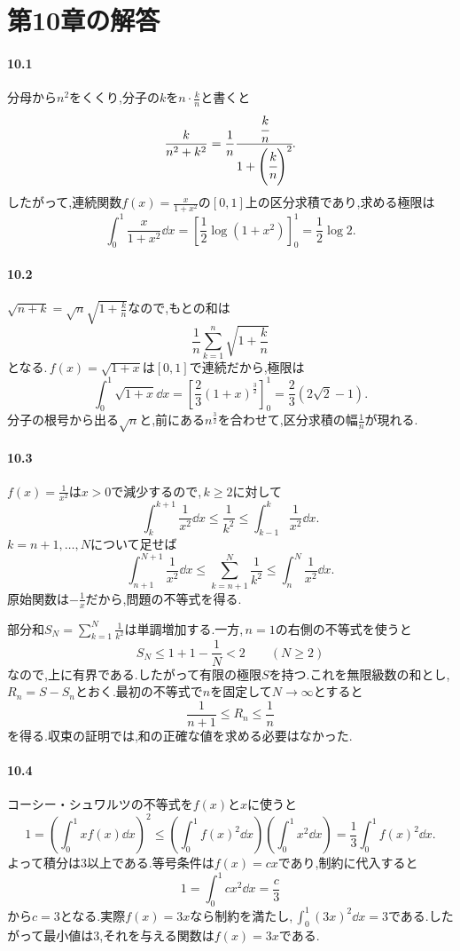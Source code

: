 \section{第10章の解答}\label{解答:第10章}

\paragraph{10.1}
分母から$n^2$をくくり,分子の$k$を$n\cdot\frac{k}{n}$と書くと
\[
 \frac{k}{n^2+k^2}
 =\frac1n\cfrac{\cfrac{k}{n}}{1+\left(\cfrac{k}{n}\right)^2}.
\]
したがって,連続関数$f(x)=\frac{x}{1+x^2}$の$[0,1]$上の区分求積であり,求める極限は
\[
 \int_0^1\frac{x}{1+x^2}\dd x
 =\left[\frac12\log(1+x^2)\right]_0^1
 =\frac12\log2.
\]

\paragraph{10.2}
$\sqrt{n+k}=\sqrt n\sqrt{1+\frac{k}{n}}$なので,もとの和は
\[
 \frac1n\sum_{k=1}^{n}\sqrt{1+\frac{k}{n}}
\]
となる.\,$f(x)=\sqrt{1+x}$は$[0,1]$で連続だから,極限は
\[
 \int_0^1\sqrt{1+x}\dd x
 =\left[\frac23(1+x)^{\frac32}\right]_0^1
 =\frac23(2\sqrt2-1).
\]
分子の根号から出る$\sqrt n$と,前にある$n^{\frac32}$を合わせて,区分求積の幅$\frac1n$が現れる.

\paragraph{10.3}
$f(x)=\frac1{x^2}$は$x>0$で減少するので,\,$k\ge2$に対して
\[
 \int_k^{k+1}\frac1{x^2}\dd x
 \le\frac1{k^2}
 \le\int_{k-1}^{k}\frac1{x^2}\dd x.
\]
$k=n+1,\ldots,N$について足せば
\[
 \int_{n+1}^{N+1}\frac1{x^2}\dd x
 \le\sum_{k=n+1}^{N}\frac1{k^2}
 \le\int_n^N\frac1{x^2}\dd x.
\]
原始関数は$-\frac1x$だから,問題の不等式を得る.

部分和$S_N=\sum_{k=1}^{N}\frac1{k^2}$は単調増加する.一方,\,$n=1$の右側の不等式を使うと
\[
 S_N\le1+1-\frac1N<2\qquad(N\ge2)
\]
なので,上に有界である.したがって有限の極限$S$を持つ.これを無限級数の和とし,\,$R_n=S-S_n$とおく.最初の不等式で$n$を固定して$N\to\infty$とすると
\[
 \frac1{n+1}\le R_n\le\frac1n
\]
を得る.収束の証明では,和の正確な値を求める必要はなかった.

\paragraph{10.4}
コーシー・シュワルツの不等式を$f(x)$と$x$に使うと
\[
 1=\left(\int_0^1xf(x)\dd x\right)^2
 \le\left(\int_0^1f(x)^2\dd x\right)
       \left(\int_0^1x^2\dd x\right)
 =\frac13\int_0^1f(x)^2\dd x.
\]
よって積分は$3$以上である.等号条件は$f(x)=cx$であり,制約に代入すると
\[
 1=\int_0^1cx^2\dd x=\frac c3
\]
から$c=3$となる.実際$f(x)=3x$なら制約を満たし,\,$\int_0^1(3x)^2\dd x=3$である.したがって最小値は$3$,それを与える関数は$f(x)=3x$である.

